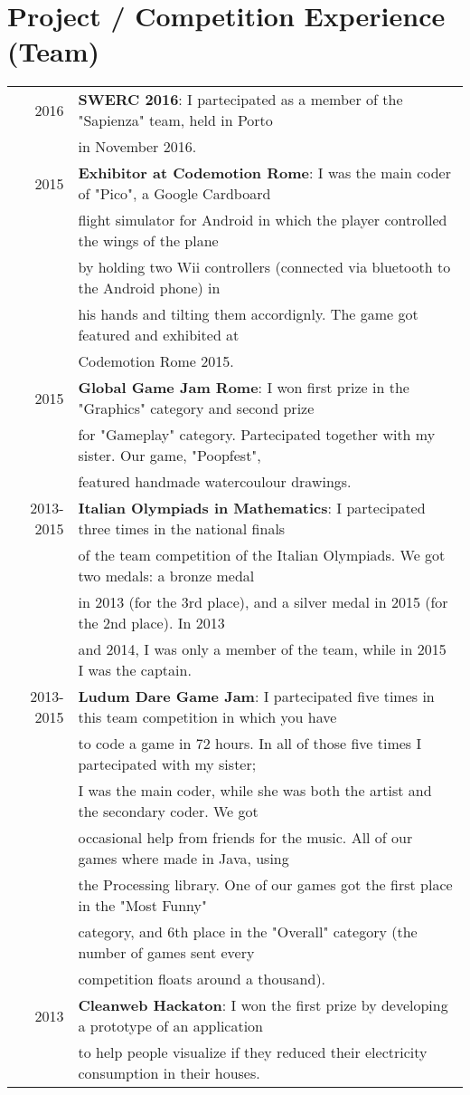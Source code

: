 \documentclass[a4paper,10pt]{article} %
\begin{document}
\section{Project / Competition Experience (Team)}
\begin{tabular}{rl}
2016 & \textbf{SWERC 2016}: I partecipated as a member of the "Sapienza" team, held in Porto\\
     & in November 2016.\\
2015 & \textbf{Exhibitor at Codemotion Rome}: I was the main coder of "Pico", a Google Cardboard \\
     & flight simulator for Android in which the player controlled the wings of the plane \\
     & by holding two Wii controllers (connected via bluetooth to the Android phone) in \\
     & his hands and tilting them accordignly. The game got featured and exhibited at \\
     & Codemotion Rome 2015.\\
2015 & \textbf{Global Game Jam Rome}: I won first prize in the "Graphics" category and second prize \\
     & for "Gameplay" category. Partecipated together with my sister. Our game, "Poopfest",\\
     & featured handmade watercoulour drawings.\\
2013-2015 & \textbf{Italian Olympiads in Mathematics}: I partecipated three times in the national finals\\
     & of the team competition of the Italian Olympiads. We got two medals: a bronze medal \\
     & in 2013 (for the 3rd place), and a silver medal in 2015 (for the 2nd place). In 2013\\
     & and 2014, I was only a member of the team, while in 2015 I was the captain.\\
2013-2015 & \textbf{Ludum Dare Game Jam}: I partecipated five times in this team competition in which you have\\
     & to code a game in 72 hours. In all of those five times I partecipated with my sister;\\
     & I was the main coder, while she was both the artist and the secondary coder. We got \\
     & occasional help from friends for the music. All of our games where made in Java, using \\
     & the Processing library. One of our games got the first place in the "Most Funny" \\
     & category, and 6th place in the "Overall" category (the number of games sent every \\
     & competition floats around a thousand).\\
2013 & \textbf{Cleanweb Hackaton}: I won the first prize by developing a prototype of an application\\
     & to help people visualize if they reduced their electricity consumption in their houses.\\
\end{tabular}
\end{document}
